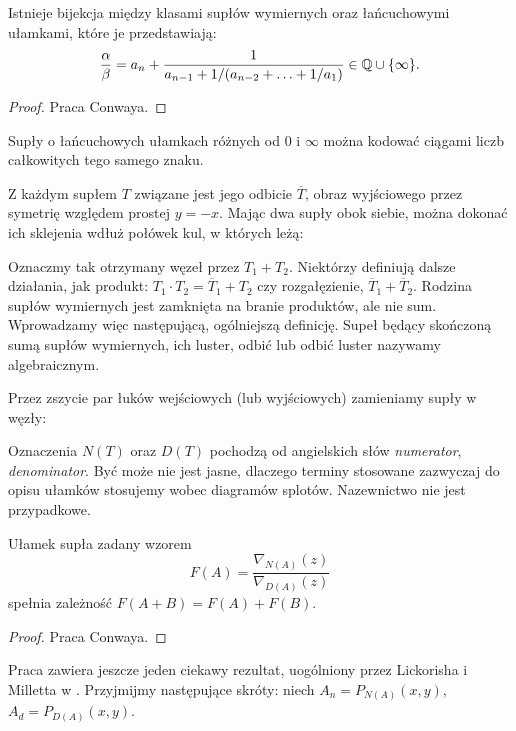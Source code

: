 \begin{proposition}
\label{prp:continued_fractions}
	Istnieje bijekcja między klasami supłów wymiernych oraz łańcuchowymi ułamkami, które je przedstawiają:
	\[
		\frac \alpha \beta = a_n + \frac{1}{a_{n-1} + 1 / (a_{n-2} +  \ldots + 1/a_1)} \in \mathbb Q \cup \{\infty\}.
	\]
\end{proposition}

\begin{proof}
	Praca \cite{conway70} Conwaya.
\end{proof}

\begin{proposition}
\label{prp:continued_fractions_2}
	Supły o łańcuchowych ułamkach różnych od $0$ i $\infty$ można kodować ciągami liczb całkowitych tego samego znaku.
\end{proposition}


Z każdym supłem $T$ związane jest jego odbicie $\overline T$, obraz wyjściowego przez symetrię względem prostej $y = -x$.
Mając dwa supły obok siebie, można dokonać ich sklejenia wdłuż połówek kul, w których leżą:


Oznaczmy tak otrzymany węzeł przez $T_1 + T_2$.
Niektórzy definiują dalsze działania, jak produkt: $T_1 \cdot T_2 = \overline T_1 + T_2$ czy rozgałęzienie, $\overline T_1 + \overline T_2$.
Rodzina supłów wymiernych jest zamknięta na branie produktów, ale nie sum.
Wprowadzamy więc następującą, ogólniejszą definicję.
Supeł będący skończoną sumą supłów wymiernych, ich luster, odbić lub odbić luster nazywamy algebraicznym.

Przez zszycie par łuków wejściowych (lub wyjściowych) zamieniamy supły w węzły:


Oznaczenia $N(T)$ oraz $D(T)$ pochodzą od angielskich słów \emph{numerator}, \emph{denominator}.
Być może nie jest jasne, dlaczego terminy stosowane zazwyczaj do opisu ułamków stosujemy wobec diagramów splotów.
Nazewnictwo nie jest przypadkowe. %
\begin{proposition}
\label{prp:knot_fraction}
	Ułamek supła zadany wzorem
	\[
		F(A) = \frac{\nabla_{N(A)}(z)}{\nabla_{D(A)}(z)}
	\]
	spełnia zależność $F(A+B) = F(A) + F(B)$.
\end{proposition}

\begin{proof}
	Praca \cite{conway70} Conwaya.
\end{proof}

Praca \cite{conway70} zawiera jeszcze jeden ciekawy rezultat, uogólniony przez Lickorisha i Milletta w \cite{lickorish87}.
Przyjmijmy następujące skróty: niech $A_n = P_{N(A)}(x,y)$, $A_d = P_{D(A)}(x,y)$.

